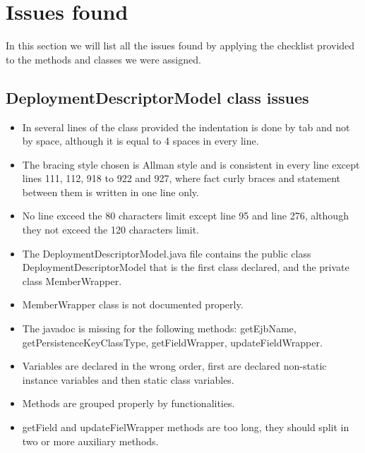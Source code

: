 \section{Issues found}
In this section we will list all the issues found by applying the checklist provided to the methods and classes we were assigned.

\subsection{DeploymentDescriptorModel class issues}
\begin{itemize}
	\item In several lines of the class provided the indentation is done by tab and not by space, although it is equal to 4 spaces in every line.
	\item The bracing style chosen is Allman style and is consistent in every line except lines 111, 112, 918 to 922 and 927, where fact curly braces and statement between them is written in one line only. 
	\item No line exceed the 80 characters limit except line 95 and line 276, although they not exceed the 120 characters limit.
	\item The DeploymentDescriptorModel.java file contains the public class DeploymentDescriptorModel that is the first class declared, and the private class MemberWrapper.
	\item MemberWrapper class is not documented properly.
	\item The javadoc is missing for the following methods: getEjbName, getPersistenceKeyClassType, getFieldWrapper, updateFieldWrapper.
	\item Variables are declared in the wrong order, first are declared non-static instance variables and then static class variables.
	\item Methods are grouped properly by functionalities.
	\item getField and updateFielWrapper methods are too long, they should split in two or more auxiliary methods.
\end{itemize}

